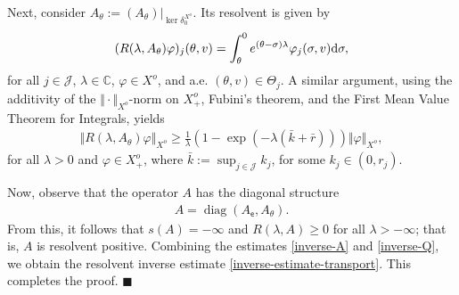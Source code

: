 \documentclass[onecolumn]{autart}
\def\la{\lambda}
\def\C{\mathbb C}
\numberwithin{equation}{section}
\newenvironment{proof}{{\it Proof: \enspace}}{\hfill $\blacksquare$\par}
\begin{document}
\begin{proof}
		Next, consider ${A}_{\theta}:=(A_{\theta})\vert_{\ker \delta_{0}^{X^{o}} }$. Its resolvent is given by
		\begin{align*}
			(R(\la,{A}_{\theta})\varphi)_j(\theta,v)=\int_{\theta}^{0} e^{(\theta-\sigma)\la}\varphi_j(\sigma,v){\rm d}\sigma,
		\end{align*}
		for all $j\in \mathcal{J}$, $\la\in \C$, $\varphi\in X^{o}$, and a.e. $(\theta,v)\in \Theta_j$. A similar argument, using the additivity of the $\Vert\cdot\Vert_{X^{o}}$-norm on $X_+^{o}$, Fubini's theorem, and the First Mean Value Theorem for Integrals, yields
		\begin{align}\label{inverse-Q}
			\Vert R(\lambda,{A}_{\theta})\varphi\Vert_{X^{o}}\ge  \frac{1}{\lambda}	\left(1-{{\exp}}(-\lambda (\bar{k}+\bar{r}))\right)\Vert \varphi\Vert_{X^{o}},
		\end{align}
		for all $\lambda>0$ and $\varphi\in X_+^{o}$, where $\bar{k}:=\sup_{j\in \mathcal{J}} k_j$, for some $k_j\in (0,r_j)$.
		
		Now, observe that the operator ${A}$ has the diagonal structure
		\begin{align}\label{A-diag}
			{A}=\operatorname{diag}({A}_{\mathsf{e}},{A}_{\theta}).
		\end{align}
		From this, it follows that $s({A})=-\infty$ and $R(\la,{A})\ge 0$ for all $\la>-\infty$; that is, $A$ is resolvent positive. Combining the estimates \eqref{inverse-A} and \eqref{inverse-Q}, we obtain the resolvent inverse estimate \eqref{inverse-estimate-transport}. This completes the proof.
	\end{proof}
	
\end{document}
